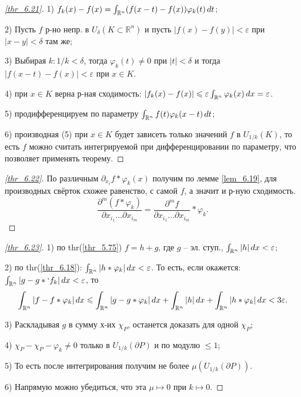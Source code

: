 \begin{proof}[\ref{thr_6.21}]
	
	1) $f_k(x) - f(x) = \int_{\mathbb{R}^n} (f(x-t) - f(x)) \varphi_k(t) \, d t$;

	2) Пусть $f$ р-но непр. в $U_\delta(K\subset \mathbb{R}^n) $ и пусть $|f(x) - f(y)|<\varepsilon$ при $|x-y|<\delta$ там же;

	3) Выбирая $k\colon 1/k <\delta$, тогда $\varphi_k(t) \neq 0 $ при $|t|<\delta$ и тогда $|f(x-t) - f(x)|<\varepsilon$ при $x \in K$.

	4) при $x \in K$ верна р-ная сходимость: $|f_k(x) - f(x)| \leqslant \varepsilon \int_{\mathbb{R}^n}\varphi_k(x) \, d x = \varepsilon$.

	5) продифференцируем по параметру $\int_{\mathbb{R}^n} f(t) \varphi_k (x-t)\, d t $;

	6) производная (5) при $x \in K$ будет зависеть только значений $f$ в $U_{1/k}(K)$, то есть $f$ можно считать интегрируемой при дифференцировании по параметру, что позволяет применять теорему.
\end{proof}

\begin{proof}[\ref{thr_6.22}]
	 По различным $\partial_{x_i} f*\varphi_k(x)$ получим по лемме \ref{lem_6.19}, для производных свёрток схожее равенство, с самой $f$, а значит и р-ную сходимость.
	\begin{equation*}
		\frac{\partial^m (f*\varphi_k)}{\partial x_{i_1}\ldots \partial x_{i_m}} = \frac{\partial^m f}{\partial x_{i_1}\ldots \partial x_{i_m}}*\varphi_k.
	\end{equation*}
\end{proof}

\begin{proof}[\ref{thr_6.23}]
	1) по thr(\ref{thr_5.75}) $f = h + g$, где $g$ -- эл. ступ., $\int_{\mathbb{R}^n} |h|\, d x <\varepsilon$;

	2) по thr(\ref{thr_6.18}): $\int_{\mathbb{R}^n}|h * \varphi_k|\, d x < \varepsilon$. То есть, если окажется: $\int_{\mathbb{R}^n}|g - g*`f_k|\, d x < \varepsilon$, то
	\begin{equation*}
		\int_{\mathbb{R}^n}|f - f*\varphi_k| \, d x \leqslant \int_{\mathbb{R}^n} |g - g* \varphi_k|\, d x + \int_{\mathbb{R}^n}|h|\, d x + \int_{\mathbb{R}^n} |h*\varphi_k| \, d x < 3 \varepsilon.
	\end{equation*}

	3) Раскладывая $g$ в сумму х-их $\chi_P$, останется доказать для одной $\chi_P$;

	4) $\chi_P - \chi_P - \varphi_k \neq 0$ только в $U_{1/k}(\partial P) $ и по модулю $\leq 1$;

	5) То есть после интегрирования получим не более $\mu(U_{1/k}(\partial P))$.

	6) Напрямую можно убедиться, что эта $\mu \mapsto 0$ при $k\mapsto 0$.
\end{proof}